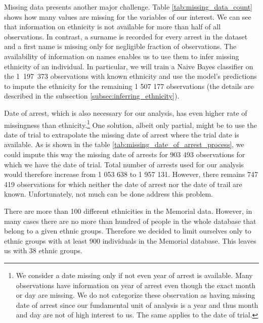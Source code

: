 Missing data presents another major challenge. 
 Table \ref{tab:missing_data_count} shows how many values are missing for the variables of our interest. We can see that information on ethnicity is not available for more than half of all observations. In contrast, a surname is recorded for every arrest in the dataset and a first name is missing only for negligible fraction of observations. The availability of information on names enables us to use them to infer missing ethnicity of an individual. In particular, we will train a Naive Bayes classifier on the \mbox{1 197 373} observations with known ethnicity and use the model's predictions to impute the ethnicity for the remaining 1 507 177 observations (the details are described in the subsection \ref{subsec:inferring_ethnicity}).


Date of arrest, which is also necessary for our analysis, has even higher rate of missingness than ethnicity.\footnote{
We consider a date missing only if not even year of arrest is available. Many observations have information on year of arrest even though the exact month or day are missing. We do not categorize these observation as having missing date of arrest since our fundamental unit of analysis is a year and thus month and day are not of high interest to us. The same applies to the date of trial.} 
One solution, albeit only partial, might be to use the date of trial    to extrapolate the missing date of arrest where the trial date is available.
As is shown in the table \ref{tab:missing_date_of_arrest_process}, we could impute this way the missing date of arrests for 903 493 observations for which we have the date of trial. 
Total number of arrests used for our analysis would therefore increase from 1 053 638 to  1 957 131.  However, there remains 747 419 observations for which neither the date of arrest nor the date of trail are known. 
Unfortunately, not much can be done address this problem.

%

There are more than 100 different ethnicities in the Memorial data. 
However, in many cases there are no more than hundred of people in the whole database that belong to a given ethnic groups. 
Therefore we decided to limit ourselves only to ethnic groups with at least 900 individuals in the Memorial database. 
This leaves us with 38 ethnic groups. 


